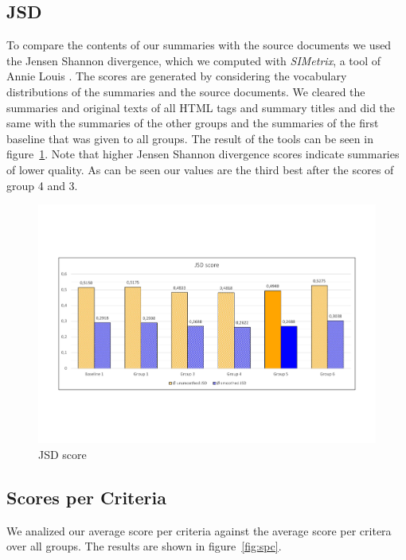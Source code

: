 \subsection{JSD}
To compare the contents of our summaries with the source documents we used the
Jensen Shannon divergence, which we computed with \textit{SIMetrix}, a tool of
Annie Louis \citep{louis}. The scores are generated by considering the vocabulary
distributions of the summaries and the source documents. We cleared the summaries
and original texts of all HTML tags and summary titles and did the same
with the summaries of the other groups and the summaries of the first baseline
that was given to all groups. The result of the tools can be seen in
figure~\ref{fig:jsd}. Note that higher Jensen Shannon divergence scores indicate
summaries of lower quality. As can be seen our values are the third best after
the scores of group 4 and 3.
\begin{figure}[H]
	\centering
	\includegraphics[trim=0 150 0 150, width=\textwidth]{img/jsd.pdf}
	\caption{JSD score}
	\label{fig:jsd}
\end{figure}


\subsection{Scores per Criteria}

We analized our average score per criteria against the average score per critera over all groups. The results are shown in figure~\ref{fig:spc}.

